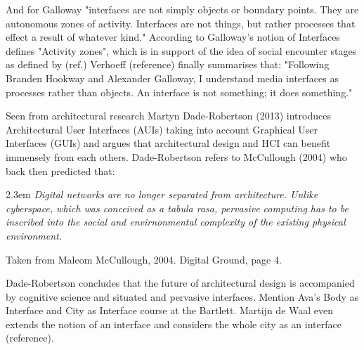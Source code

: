 And for Galloway "interfaces are not simply objects or boundary points. They are autonomous zones of activity. Interfaces are not things, but rather processes that effect a result of whatever kind."
According to Galloway's notion of Interfaces defines "Activity zones", which is in support of the idea of social encounter stages as defined by (ref.) 
Verhoeff (reference) finally summarises that: "Following Branden Hookway and Alexander Galloway, I understand media interfaces as processes rather than objects. An interface is not something; it does something."


Seen from architectural research Martyn Dade-Robertson (2013) introduces Architectural User Interfaces (AUIs) taking into account Graphical User Interfaces (GUIs) and argues that architectural design and HCI can benefit immensely from each others.
Dade-Robertson refers to McCullough (2004) who back then predicted that:

\begin{singlespace}
	\leftskip2.3em
		\rightskip\leftskip
\textit{\small Digital networks are no longer separated from architecture. Unlike cyberspace, which was conceived as a tabula rasa, pervasive computing has to be inscribed into the social and envirnonmental complexity of the existing physical environment.} 

\small Taken from Malcom McCullough, 2004. Digital Ground, page 4.
\end{singlespace}

Dade-Robertson concludes that the future of architectural design is accompanied by cognitive science and situated and pervasive interfaces.
Mention Ava's Body as Interface and City as Interface course at the Bartlett.
Martijn de Waal even extends the notion of an interface and considers the whole city as an interface (reference). 

